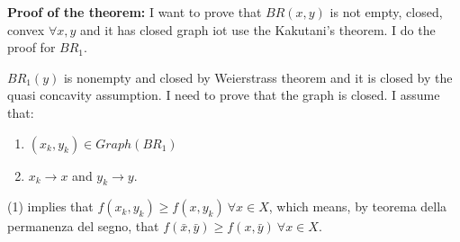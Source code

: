 \bigskip
\noindent \textbf{Proof of the theorem:} I want to prove that $BR(x,y)$ is 
not empty, closed, convex $\forall x,y$ and it has closed graph iot use 
the Kakutani's theorem. I do the proof for $BR_1$.



\noindent $BR_1(y)$ is nonempty and closed by Weierstrass theorem and 
it is closed by the quasi concavity assumption. I need to prove that 
the graph is closed. I assume that:
\begin{enumerate}
	\item $(x_k,y_k) \in Graph(BR_1)$
	\item $x_k \rightarrow x$ and $y_k \rightarrow y$.
\end{enumerate}

(1) implies that $f(x_k,y_k) \geq f(x,y_k) ~\forall x \in X$, which means, 
by teorema della permanenza del segno, that $f(\bar{x},\bar{y}) \geq 
f(x,\bar{y}) ~\forall x \in X$.

%
